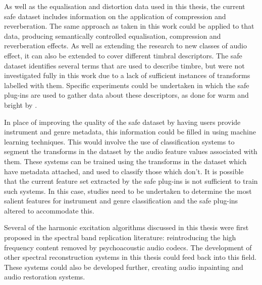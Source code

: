 	As well as the equalisation and distortion data used in this thesis, the current \acrshort{safe} dataset includes
	information on the application of compression and reverberation. The same approach as taken in this work could be
	applied to that data, producing semantically controlled equalisation, compression and reverberation effects. As well
	as extending the research to new classes of audio effect, it can also be extended to cover different timbral
	descriptors. The \acrshort{safe} dataset identifies several terms that are used to describe timbre, but were not
	investigated fully in this work due to a lack of sufficient instances of transforms labelled with them. Specific
	experiments could be undertaken in which the \acrshort{safe} plug-ins are used to gather data about these
	descriptors, as done for warm and bright by \citet{stasis2015a}.

	In place of improving the quality of the \acrshort{safe} dataset by having users provide instrument and genre
	metadata, this information could be filled in using machine learning techniques. This would involve the use of
	classification systems to segment the transforms in the dataset by the audio feature values associated with them.
	These systems can be trained using the transforms in the dataset which have metadata attached, and used to classify
	those which don't.  It is possible that the current feature set extracted by the \acrshort{safe} plug-ins is not
	sufficient to train such systems.  In this case, studies need to be undertaken to determine the most salient
	features for instrument and genre classification and the \acrshort{safe} plug-ins altered to accommodate this.

	Several of the harmonic excitation algorithms discussed in this thesis were first proposed in the spectral band
	replication literature: reintroducing the high frequency content removed by psychoacoustic audio codecs. The
	development of other spectral reconstruction systems in this thesis could feed back into this field. These systems
	could also be developed further, creating audio inpainting and audio restoration systems.

